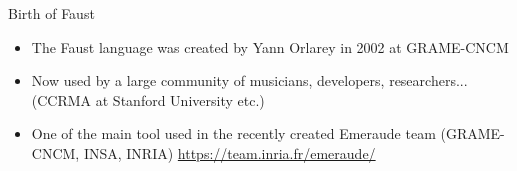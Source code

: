 
\begin{frame}[fragile]{Birth of Faust}
	\begin{itemize}
		
		\item The Faust language was created by Yann Orlarey in 2002 at GRAME-CNCM
		\item  Now used by a large community of musicians, developers, researchers... (CCRMA at Stanford University etc.) 
		\item  One of the main tool used in the recently created Emeraude team (GRAME-CNCM, INSA, INRIA) \url{https://team.inria.fr/emeraude/}
	\end{itemize}
	
\end{frame}
